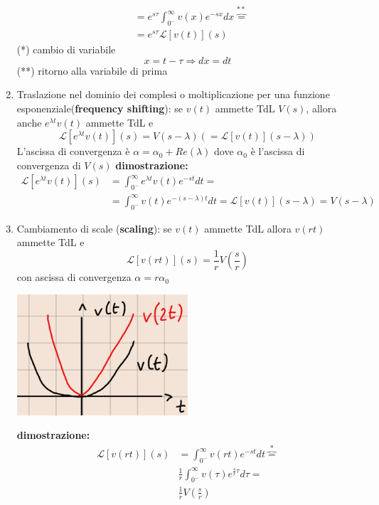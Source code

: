 \documentclass[a4paper, 12pt]{book}
\theoremstyle{plain}
\begin{document}
\begin{enumerate}
\[\begin{split}
            &= e^{s\tau} \int_{0^-}^\infty v(x) e^{-sx} dx \overbrace{=}^{**} \\
            &= e^{s \tau} \mathcal{L} [v(t)] (s)
        \end{split}
    \]
    (*) cambio di variabile \[x = t - \tau \Rightarrow dx = dt\]
    (**) ritorno alla variabile di prima
    \item Traslazione nel dominio dei complesi o moltiplicazione per una funzione esponenziale(\textbf{frequency shifting}):
    se $v(t)$ ammette TdL $V(s)$, allora anche $e^{\lambda t}v(t)$ ammette TdL e 
    \[
        \mathcal{L} [e^{\lambda t} v(t)] (s) = V(s - \lambda) (= \mathcal{L} [v(t)] (s- \lambda))
    \]
    L'ascissa di convergenza è $\alpha = \alpha_0 + Re(\lambda)$ dove $\alpha_0$ è l'ascissa di convergenza di $V(s)$ \textbf{dimostrazione:}
    \[
        \begin{split}
            \mathcal{L} [e^{\lambda t} v(t)] (s) &= \int_{0^-}^\infty e^{\lambda t} v(t) e^{-st} dt = \\
            &= \int_{0^-}^\infty v(t) e^{-(s - \lambda)t} dt = \mathcal{L} [v(t)] (s - \lambda) = V(s - \lambda)
        \end{split}
    \]
    \item Cambiamento di scale (\textbf{scaling}): se $v(t)$ ammette TdL allora $v(rt)$ ammette TdL e 
    \[
        \mathcal{L} [v(rt)] (s) = \frac{1}{r} V(\frac{s}{r})
    \]
    con ascissa di convergenza $\alpha = r \alpha_0$
    \begin{center}
        \includegraphics[width=0.5\textwidth]{RdC4.png}
    \end{center}
    \textbf{dimostrazione:}
    \[
        \begin{split}
            \mathcal{L} [v(rt)] (s) &= \int_{0^-}^\infty v(rt) e^{-st} dt \overbrace{=}^* \\
            & \frac{1}{r} \int_{0^-}^\infty v(\tau) e^{\frac{s}{r} \tau} d \tau = \\
            &\frac{1}{r} V(\frac{s}{r})
        \end{split}
\]
\end{enumerate}
\end{document}
